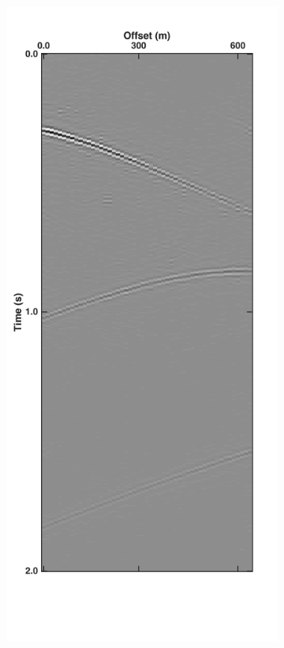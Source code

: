 \begin{figure}
\begin{subfigure}[t]{0.24\textwidth}
		\caption{}
		\label{fig:Ch-Results-Debl-inline10-t}
	\end{subfigure}
	\centering
	\begin{subfigure}[t]{0.24\textwidth}
		\centering
		\includegraphics[height = 0.38\textheight]{Plots/BlendingPatterns/Deblended_inline10xt}

\end{subfigure}
\end{figure}
